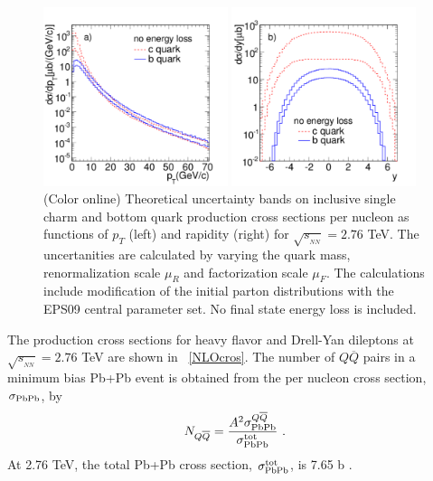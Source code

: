 \begin{figure}
\includegraphics[width=0.48\textwidth]{chap_DiMuonContinuum_figures/Fig1a_histNoEloss_Pt}

\includegraphics[width=0.48\textwidth]{chap_DiMuonContinuum_figures/Fig1b_histNoEloss_Rap}
\caption{(Color online) Theoretical uncertainty bands on inclusive single 
charm and bottom quark production cross sections per nucleon as functions 
of $p_T$ (left) and rapidity (right) for $\sqrt{s_{_{NN}}} = 2.76$ TeV. 
The uncertanities are calculated by 
varying the quark mass, renormalization scale $\mu_{R}$
and factorization scale $\mu_{F}$. The calculations include 
modification of the initial parton distributions with the EPS09 central
parameter set.
No final state energy loss is included.}
\label{QPtYUncertNoLoss}
\end{figure}
The production cross sections for heavy flavor and Drell-Yan dileptons
at $\sqrt{s_{_{NN}}}= 2.76$ 
TeV are shown in \Table~\ref{NLOcros}.  The number of $Q \overline Q$ pairs
in a minimum bias Pb+Pb event is obtained from the per nucleon cross
section, $\sigma_{\rm PbPb}$, by
\begin{eqnarray}
N_{Q \overline Q} = {A^2 \sigma_{\rm PbPb}^{Q \overline Q}  \over  
\sigma_{\rm PbPb}^{\rm tot}} \, \, .
\end{eqnarray}
At 2.76 TeV, the total Pb+Pb cross section, $\sigma_{\rm PbPb}^{\rm tot}$, 
is 7.65 b \cite{PbPbTotal}.

